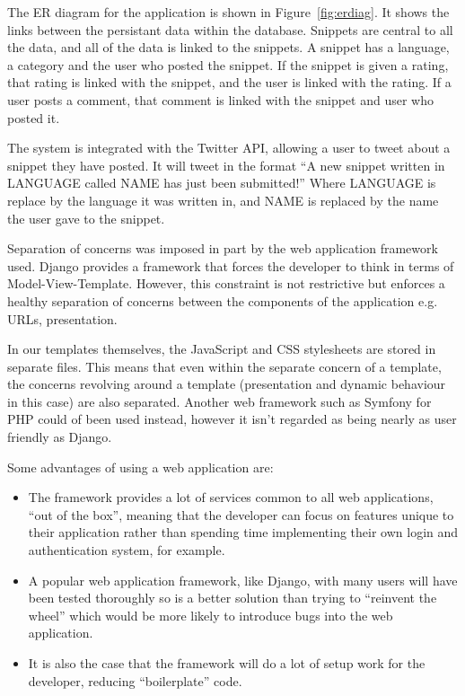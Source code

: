 \documentclass{sig-alt-release2}
\begin{document}
The ER diagram for the application is shown in Figure~\ref{fig:erdiag}.
It shows the links between the persistant data within the database.
Snippets are central to all the data, and all of the data is linked
to the snippets. A snippet has a language, a category and the user
who posted the snippet. If the snippet is given a rating, that
rating is linked with the snippet, and the user is linked with the
rating. If a user posts a comment, that comment is linked with the
snippet and user who posted it.

The system is integrated with the Twitter API, allowing a user to
tweet about a snippet they have posted. It will tweet in the format
``A new snippet written in LANGUAGE called NAME has just been submitted!''
Where LANGUAGE is replace by the language it was written in, and NAME
is replaced by the name the user gave to the snippet.

Separation of concerns was imposed in part by the web application
framework used.
Django provides a framework that forces the developer to think in terms
of Model-View-Template. However, this constraint is not restrictive but
enforces a healthy separation of concerns between the components of
the application e.g. URLs, presentation.

In our templates themselves, the JavaScript and CSS stylesheets are
stored in separate files. This means that even within the separate concern
of a template, the concerns revolving around a template (presentation and
dynamic behaviour in this case) are also separated.
Another web framework such as Symfony for PHP could of been used instead,
however it isn't regarded as being nearly as user friendly as Django.

Some advantages of using a web application are:
\begin{itemize}
\item The framework provides a lot of services common to all web
applications, ``out of the box'', meaning that the developer can focus
on features unique to their application rather than spending time
implementing their own login and authentication system, for example.
\item A popular web application framework, like Django, with many
users will have been tested thoroughly so is a better solution than
trying to ``reinvent the wheel'' which would be more likely to
introduce bugs into the web application.
\item It is also the case that the framework will do a lot of setup work
for the developer, reducing ``boilerplate'' code.
\end{itemize}
\end{document}

